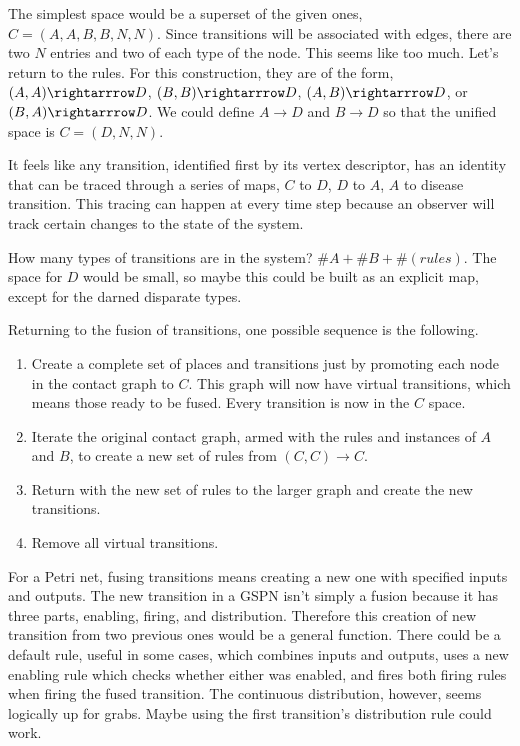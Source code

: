 \documentclass{article}
\begin{document}
The simplest space would be a superset of the given ones,
$C=(A,A,B,B,N,N)$. Since transitions will be associated with edges,
there are two $N$ entries and two of each type of the node.
This seems like too much. Let's return to the rules. For this
construction, they are of the form,
$(A,A)\rightarrrow D$, $(B,B)\rightarrrow D$, $(A,B)\rightarrrow D$,
or $(B,A)\rightarrrow D$. We could define $A→D$ and $B→D$ so
that the unified space is $C=(D,N,N)$.

It feels like any transition, identified first by its vertex
descriptor, has an identity that can be traced through a series
of maps, $C$ to $D$, $D$ to $A$, $A$ to disease transition.
This tracing can happen at every time step because an observer will
track certain changes to the state of the system.

How many types of transitions are in the system?
$\#A+\#B+\#(rules)$. The space for $D$ would be small, so maybe
this could be built as an explicit map, except for the darned
disparate types.

Returning to the fusion of transitions, one possible sequence is
the following.

\begin{enumerate}
\item Create a complete set of places and transitions just by promoting
each node in the contact graph to $C$. This graph will now have
virtual transitions, which means those ready to be fused. Every 
transition is now in the $C$ space.

\item Iterate the original contact graph, armed with the rules
and instances of $A$ and $B$, to create a new set of rules
from $(C,C) → C$.

\item Return with the new set of rules to the larger graph and
create the new transitions.

\item Remove all virtual transitions.
\end{enumerate}

For a Petri net, fusing transitions means creating a new one
with specified inputs and outputs. The new transition in a GSPN
isn't simply a fusion because it has three parts, enabling, firing,
and distribution. Therefore this creation of new transition
from two previous ones would be a general function. There could
be a default rule, useful in some cases, which combines inputs
and outputs, uses a new enabling rule which checks whether either
was enabled, and fires both firing rules when firing the fused
transition. The continuous distribution, however, seems logically
up for grabs. Maybe using the first transition's distribution
rule could work.
\end{document}
